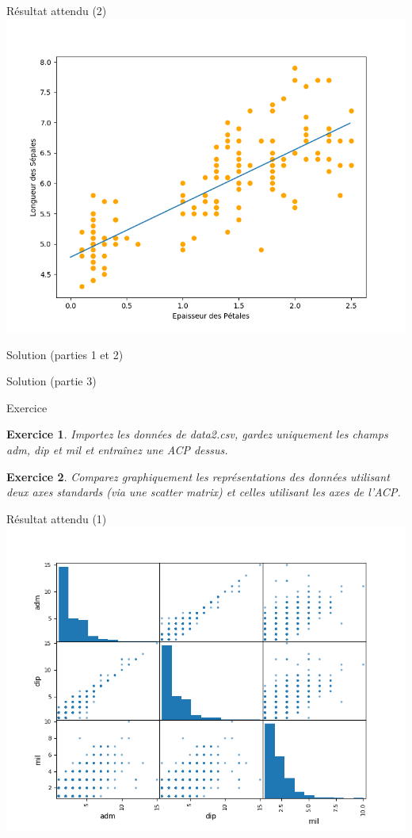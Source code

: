 \documentclass[11pt]{beamer}
\newtheorem{exercice}{Exercice}
\newcommand{\Python}[1]{
	{\small	}
}
\begin{document}
\begin{frame}{Résultat attendu (2)}
\includegraphics[scale=0.45]{ex302bis}
\end{frame}


\begin{frame}{Solution (parties 1 et 2)}
\Python{ex301}
\end{frame}

\begin{frame}{Solution (partie 3)}
\Python{ex302}
\end{frame}

\begin{frame}{Exercice}
\begin{exercice}
Importez les données de data2.csv, gardez uniquement les champs adm, dip et mil et entraînez une ACP dessus.
\end{exercice}
\begin{exercice}
Comparez graphiquement les représentations des données utilisant deux axes standards (via une scatter matrix) et celles utilisant les axes de l'ACP.
\end{exercice}
\end{frame}

\begin{frame}{Résultat attendu (1)}
\includegraphics[scale=0.42]{ex402}
\end{frame}
\end{document}
